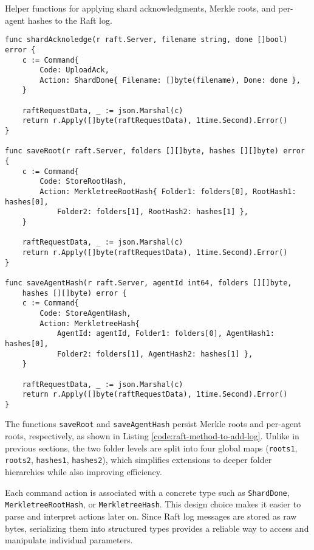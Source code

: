 \begin{listing}[H]
\caption{Helper functions for applying shard acknowledgments, Merkle roots, and per-agent hashes to the Raft log.}
\label{code:raft-method-to-add-log}
\begin{verbatim}
func shardAcknoledge(r raft.Server, filename string, done []bool) error {
    c := Command{
        Code: UploadAck,
        Action: ShardDone{ Filename: []byte(filename), Done: done },
    }

    raftRequestData, _ := json.Marshal(c)
    return r.Apply([]byte(raftRequestData), 1time.Second).Error()
}

func saveRoot(r raft.Server, folders [][]byte, hashes [][]byte) error {
    c := Command{
        Code: StoreRootHash,
        Action: MerkletreeRootHash{ Folder1: folders[0], RootHash1: hashes[0],
            Folder2: folders[1], RootHash2: hashes[1] },
    }

    raftRequestData, _ := json.Marshal(c)
    return r.Apply([]byte(raftRequestData), 1time.Second).Error()
}

func saveAgentHash(r raft.Server, agentId int64, folders [][]byte,
    hashes [][]byte) error {
    c := Command{
        Code: StoreAgentHash,
        Action: MerkletreeHash{
            AgentId: agentId, Folder1: folders[0], AgentHash1: hashes[0],
            Folder2: folders[1], AgentHash2: hashes[1] },
    }

    raftRequestData, _ := json.Marshal(c)
    return r.Apply([]byte(raftRequestData), 1time.Second).Error()
}
\end{verbatim}
\end{listing}

The functions \texttt{saveRoot} and \texttt{saveAgentHash} persist Merkle roots and per-agent roots, respectively, as shown in Listing \ref{code:raft-method-to-add-log}. Unlike in previous sections, the two folder levels are split into four global maps (\texttt{roots1}, \texttt{roots2}, \texttt{hashes1}, \texttt{hashes2}), which simplifies extensions to deeper folder hierarchies while also improving efficiency.

Each command action is associated with a concrete type such as \texttt{ShardDone}, \texttt{MerkletreeRootHash}, or \texttt{MerkletreeHash}. This design choice makes it easier to parse and interpret actions later on. Since Raft log messages are stored as raw bytes, serializing them into structured types provides a reliable way to access and manipulate individual parameters.

